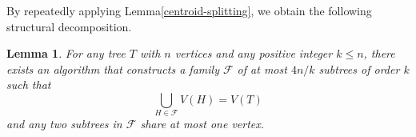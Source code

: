 \documentclass[letter,11pt]{article}
\newtheorem{la}[thm]{Lemma}
\theoremstyle{definition}
\theoremstyle{definition}
\newcommand{\1}{\boldmath$~1~$\unboldmath}
\newcommand{\Ord}{\mathrm{O}}
\newcommand{\tume}{\hspace*{0.2em}}
\begin{document}



By repeatedly applying Lemma\tume\ref{centroid-splitting}, we obtain the
following structural decomposition.
\begin{la}\label{bunkatsu}
For any tree $T$ with $n$ vertices and any positive integer $k \le n$,
there exists an algorithm that constructs a family $\mathcal{F}$ of at most
$4n/k$ subtrees of order $k$ such that
\[
\bigcup_{H\in\mathcal{F}} V(H)=V(T)
\]
and any two subtrees in $\mathcal{F}$ share at most one vertex.
\end{la}
\end{document}
